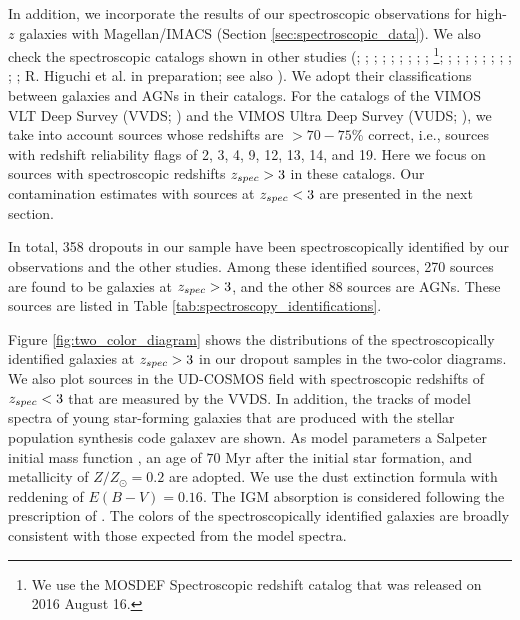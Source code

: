 \documentclass[]{pasj01}
\begin{document}
In addition, 
we incorporate the results of our spectroscopic observations for high-$z$ galaxies 
with Magellan/IMACS (Section \ref{sec:spectroscopic_data}). 
We also check the spectroscopic catalogs shown in other studies 
(\cite{2008ApJ...675.1076S}; \cite{2008ApJS..176..301O}; \cite{2010AJ....140..546W}; 
\cite{2012MNRAS.422.1425C}; \cite{2012ApJ...755..169M}; \cite{2012ApJ...760..128M}; 
\cite{2013AJ....145....4W}; \cite{2013A&A...559A..14L}; \cite{2015ApJ...798...28K}; 
\cite{2015ApJS..218...15K}\footnote{
We use the MOSDEF Spectroscopic redshift catalog 
that was released on 2016 August 16.}; 
\cite{2016ApJ...819...24W}; \cite{2016ApJ...826..114T}; 
\cite{2016ApJS..225...27M};
\cite{2016ApJ...828...26M}; \cite{2017A&A...597A..79P}; \cite{2017A&A...600A.110T}; 
\cite{2017AJ....153..184Y}; 
\cite{2017ApJ...841..111M}; 
\cite{2017arXiv170405854M}; \cite{2017arXiv170500733S}; 
R. Higuchi et al. in preparation; 
see also \cite{2016ApJS..227...11B}). 
We adopt their classifications between galaxies and AGNs in their catalogs.  
For the catalogs of 
the VIMOS VLT Deep Survey (VVDS; \cite{2013A&A...559A..14L}) 
and 
the VIMOS Ultra Deep Survey (VUDS; \cite{2017A&A...600A.110T}), 
we take into account sources 
whose redshifts are $>70-75${\%} correct, 
i.e., sources with redshift reliability flags of 2, 3, 4, 9, 12, 13, 14, and 19.  
Here we focus on sources with spectroscopic redshifts 
$z_{\rm spec} > 3$ in these catalogs. 
Our contamination estimates with sources at $z_{\rm spec} < 3$ 
are presented in the next section. 



In total, 
358 dropouts in our sample have been spectroscopically identified 
by our observations and the other studies. 
Among these identified sources, 
270 sources are found to be galaxies at $z_{\rm spec}>3$, 
and the other 
88 sources are AGNs. 
These sources are listed in Table \ref{tab:spectroscopy_identifications}. 



Figure \ref{fig:two_color_diagram} shows the distributions of 
the spectroscopically identified galaxies at $z_{\rm spec} > 3$ in our dropout samples 
in the two-color diagrams. 
We also plot sources in the UD-COSMOS field 
with spectroscopic redshifts of $z_{\rm spec} < 3$ 
that are measured by the VVDS. 
In addition, 
the tracks of model spectra of young star-forming galaxies 
that are produced with the stellar population synthesis code {\sc galaxev} 
\citep{2003MNRAS.344.1000B} are shown. 
As model parameters 
a Salpeter initial mass function \citep{1955ApJ...121..161S}, 
an age of $70$ Myr after the initial star formation, 
and metallicity of $Z / Z_\odot = 0.2$ are adopted. 
We use the \citet{2000ApJ...533..682C} dust extinction formula 
with reddening of $E(B-V) = 0.16$. 
The IGM absorption is considered 
following the prescription of \citet{1995ApJ...441...18M}. 
The colors of the spectroscopically identified galaxies are 
broadly consistent with those expected from the model spectra. 
\end{document}
